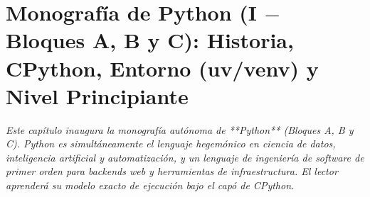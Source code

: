 \documentclass{book}
\begin{document}
\chapter{Monografía de Python (I \(-\) Bloques A, B y C): Historia, CPython, Entorno (uv/venv) y Nivel Principiante}
\label{chap:cap01-python-fundamentos-modelo-objetos-nivel-principiante}

\noindent\textit{Este capítulo inaugura la monografía autónoma de **Python** (Bloques A, B y C). Python es simultáneamente el lenguaje hegemónico en ciencia de datos, inteligencia artificial y automatización, y un lenguaje de ingeniería de software de primer orden para backends web y herramientas de infraestructura. El lector aprenderá su modelo exacto de ejecución bajo el capó de CPython.}
\end{document}
